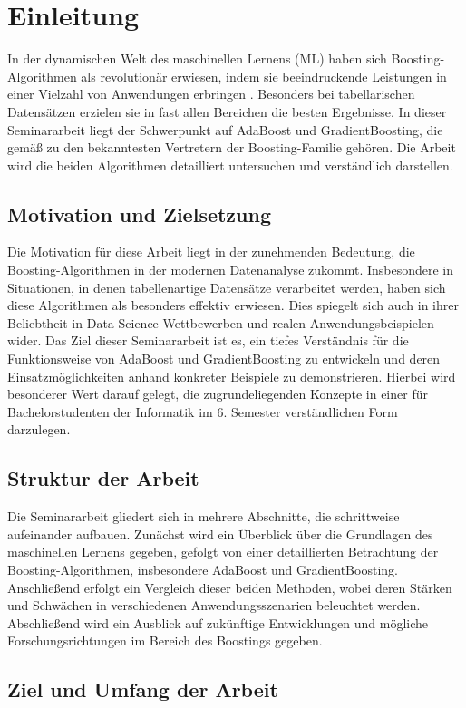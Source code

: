 \section{Einleitung}

In der dynamischen Welt des maschinellen Lernens (ML) haben sich Boosting-Algorithmen als revolutionär erwiesen, indem sie beeindruckende Leistungen in einer Vielzahl von Anwendungen erbringen \parencite[Kapitel 1.1.2]{SchapireFreund2012}. Besonders bei tabellarischen Datensätzen erzielen sie in fast allen Bereichen die besten Ergebnisse. 
\newline
In dieser Seminararbeit liegt der Schwerpunkt auf AdaBoost und GradientBoosting, die gemäß \textcite[S.~192]{Geron2018} zu den bekanntesten Vertretern der Boosting-Familie gehören. Die Arbeit wird die beiden Algorithmen detailliert untersuchen und verständlich darstellen.

\subsection{Motivation und Zielsetzung}

Die Motivation für diese Arbeit liegt in der zunehmenden Bedeutung, die Boosting-Algorithmen in der modernen Datenanalyse zukommt. Insbesondere in Situationen, in denen tabellenartige Datensätze verarbeitet werden, haben sich diese Algorithmen als besonders effektiv erwiesen. Dies spiegelt sich auch in ihrer Beliebtheit in Data-Science-Wettbewerben und realen Anwendungsbeispielen wider. Das Ziel dieser Seminararbeit ist es, ein tiefes Verständnis für die Funktionsweise von AdaBoost und GradientBoosting zu entwickeln und deren Einsatzmöglichkeiten anhand konkreter Beispiele zu demonstrieren. Hierbei wird besonderer Wert darauf gelegt, die zugrundeliegenden Konzepte in einer für Bachelorstudenten der Informatik im 6. Semester verständlichen Form darzulegen.

\subsection{Struktur der Arbeit}

Die Seminararbeit gliedert sich in mehrere Abschnitte, die schrittweise aufeinander aufbauen. Zunächst wird ein Überblick über die Grundlagen des maschinellen Lernens gegeben, gefolgt von einer detaillierten Betrachtung der Boosting-Algorithmen, insbesondere AdaBoost und GradientBoosting. Anschließend erfolgt ein Vergleich dieser beiden Methoden, wobei deren Stärken und Schwächen in verschiedenen Anwendungsszenarien beleuchtet werden. Abschließend wird ein Ausblick auf zukünftige Entwicklungen und mögliche Forschungsrichtungen im Bereich des Boostings gegeben.



\cite[text]{Frochte2020}
\cite[text]{SchapireFreund2012}
\cite[text]{Geron2018}
\cite[text]{James2023}
\cite[text]{Hastie2009}


\subsection{Ziel und Umfang der Arbeit}
 